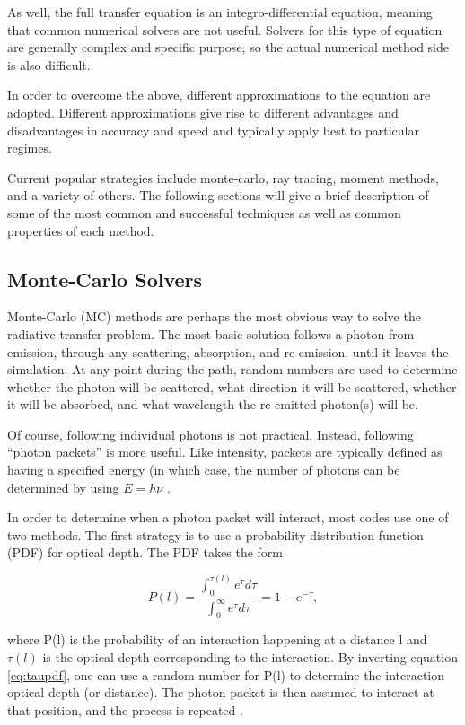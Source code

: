As well, the full transfer equation is an integro-differential equation, meaning that common numerical solvers are not useful. Solvers for this type of equation are generally complex and specific purpose, so the actual numerical method side is also difficult.

In order to overcome the above, different approximations to the equation are adopted. Different approximations give rise to different advantages and disadvantages in accuracy and speed and typically apply best to particular regimes.

Current popular strategies include monte-carlo, ray tracing, moment methods, and a variety of others. The following sections will give a brief description of some of the most common and successful techniques as well as common properties of each method.

\subsection{Monte-Carlo Solvers}
\label{sec:montecarlo}

Monte-Carlo (MC) methods are perhaps the most obvious way to solve the radiative transfer problem. The most basic solution follows a photon from emission, through any scattering, absorption, and re-emission, until it leaves the simulation. At any point during the path, random numbers are used to determine whether the photon will be scattered, what direction it will be scattered, whether it will be absorbed, and what wavelength the re-emitted photon(s) will be.

Of course, following individual photons is not practical. Instead, following ``photon packets'' is more useful. Like intensity, packets are typically defined as having a specified energy (in which case, the number of photons can be determined by using $E = h\nu$ \citep{ercolanoEt03,abbottLucy85}.

In order to determine when a photon packet will interact, most codes use one of two methods. The first strategy is to use a probability distribution function (PDF) for optical depth. The PDF takes the form

\begin{equation}
\label{eq:taupdf}
P(l) = \frac{\int_0^{\tau(l)}e^{\tau}d\tau}{\int_0^{\infty}e^{\tau}d\tau} = 1-e^{-\tau},
\end{equation}

\noindent
where P(l) is the probability of an interaction happening at a distance l and $\tau(l)$ is the optical depth corresponding to the interaction. By inverting equation \ref{eq:taupdf}, one can use a random number for P(l) to determine the interaction optical depth (or distance). The photon packet is then assumed to interact at that position, and the process is repeated \citep{harriesHowarth97}.

